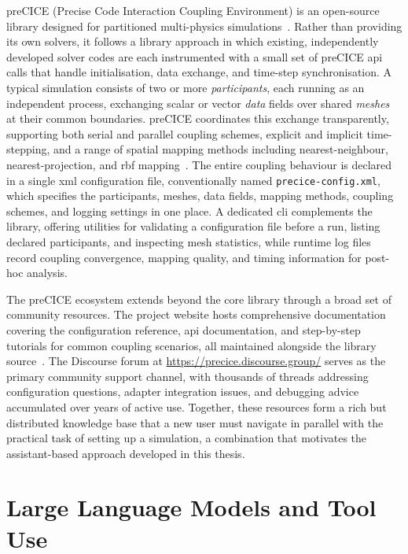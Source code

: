 \documentclass[
  numbers=noenddot,
  english,
  a4paper,
  twoside,
  bibliography=totoc,
  headsepline,
  cleardoublepage=empty,
  parskip=half,
  draft=false
]{scrbook}
\theoremstyle{break}
\renewcommand{\_}{\textunderscore\allowbreak}
\begin{document}
preCICE (Precise Code Interaction Coupling Environment) is an open-source library designed
for partitioned multi-physics simulations~\cite{chourdakis2022precice}.
Rather than providing its own solvers, it follows a library approach in which existing,
independently developed solver codes are each instrumented with a small set of preCICE
\gls{api} calls that handle initialisation, data exchange, and time-step synchronisation.
A typical simulation consists of two or more \emph{participants}, each running as an
independent process, exchanging scalar or vector \emph{data} fields over shared
\emph{meshes} at their common boundaries.
preCICE coordinates this exchange transparently, supporting both serial and parallel coupling
schemes, explicit and implicit time-stepping, and a range of spatial mapping methods including
nearest-neighbour, nearest-projection, and \gls{rbf} mapping~\cite{chourdakis2022precice}.
The entire coupling behaviour is declared in a single \gls{xml} configuration file, conventionally
named \texttt{precice-config.xml}, which specifies the participants, meshes, data fields,
mapping methods, coupling schemes, and logging settings in one place.
A dedicated \gls{cli} complements the library, offering utilities for validating a configuration
file before a run, listing declared participants, and inspecting mesh statistics, while runtime
log files record coupling convergence, mapping quality, and timing information for
post-hoc analysis.

The preCICE ecosystem extends beyond the core library through a broad set of community
resources.
The project website hosts comprehensive documentation covering the configuration reference,
\gls{api} documentation, and step-by-step tutorials for common coupling scenarios, all
maintained alongside the library source~\cite{chourdakis2022precice}.
The Discourse forum at \url{https://precice.discourse.group/} serves as the primary
community support channel, with thousands of threads addressing configuration questions,
adapter integration issues, and debugging advice accumulated over years of active use.
Together, these resources form a rich but distributed knowledge base that a new user must
navigate in parallel with the practical task of setting up a simulation, a combination that
motivates the assistant-based approach developed in this thesis.


\section{Large Language Models and Tool Use}\label{sec:background:llm}
\end{document}
